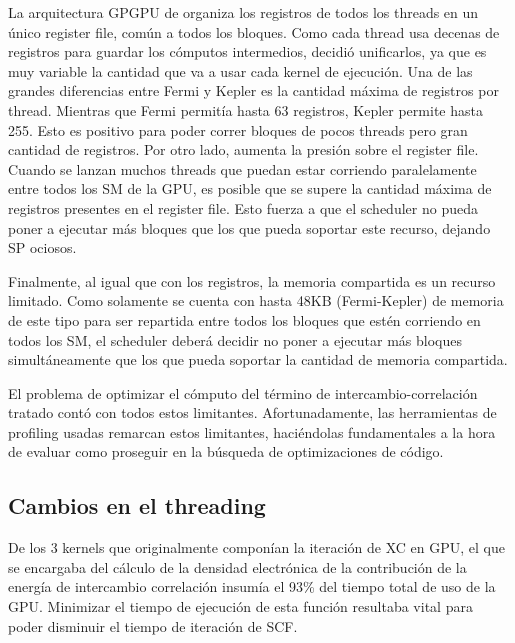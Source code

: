 La arquitectura GPGPU de \nvidia organiza los registros de todos los threads en un \'unico
register file, com\'un a todos los bloques. Como cada thread usa decenas de registros para guardar
los c\'omputos intermedios, \nvidia decidi\'o unificarlos, ya que es muy variable la cantidad que va a usar
cada kernel de ejecuci\'on. Una de las grandes diferencias entre Fermi y Kepler es la cantidad m\'axima de
registros por thread. Mientras que Fermi permit\'ia hasta 63 registros, Kepler permite hasta 255. Esto
es positivo para poder correr bloques de pocos threads pero gran cantidad de registros. Por otro lado,
aumenta la presi\'on sobre el register file. Cuando se lanzan muchos threads
que puedan estar corriendo paralelamente entre todos los SM de la GPU, es posible que se supere
la cantidad m\'axima de registros presentes en el register file. Esto fuerza a que el scheduler
no pueda poner a ejecutar m\'as bloques que los que pueda soportar este recurso, dejando SP ociosos.

Finalmente, al igual que con los registros, la memoria compartida es un recurso limitado. Como
solamente se cuenta con hasta 48KB (Fermi-Kepler) de memoria de este tipo para ser repartida entre
todos los bloques que est\'en corriendo en todos los SM, el scheduler deber\'a decidir no poner a ejecutar
m\'as bloques simult\'aneamente que los que pueda soportar la cantidad de memoria compartida.

El problema de optimizar el c\'omputo del t\'ermino de intercambio-correlaci\'on tratado  cont\'o
con todos estos limitantes. Afortunadamente,
las herramientas de profiling usadas remarcan estos limitantes, haci\'endolas
fundamentales a la hora de evaluar como proseguir en la b\'usqueda de optimizaciones de c\'odigo.

\subsection{Cambios en el threading}

De los 3 kernels que originalmente compon\'ian la iteraci\'on de XC en GPU, el que se encargaba
del c\'alculo de la densidad electr\'onica de la contribuci\'on de la energ\'ia de intercambio correlaci\'on
insum\'ia el 93\% del tiempo total de uso de la GPU. Minimizar el tiempo de ejecuci\'on de
esta funci\'on resultaba vital para poder disminuir el tiempo de iteraci\'on de SCF.


